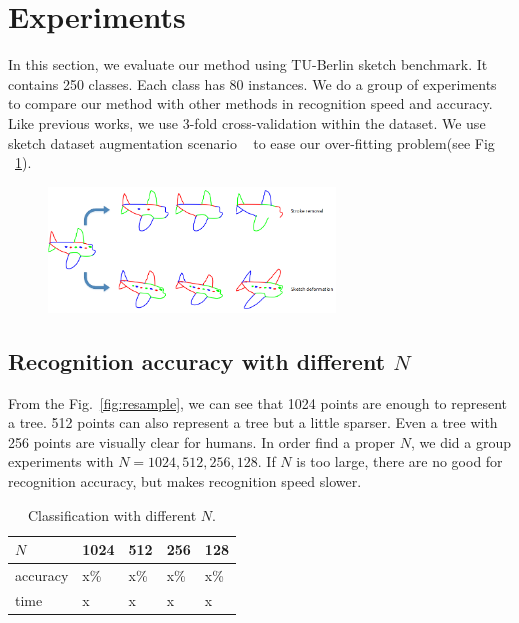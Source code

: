 \section{Experiments}
\label{sec:experiments}
In this section, we evaluate our method using  TU-Berlin sketch benchmark. It contains 250 classes. Each class has 80 instances. We do a group of experiments to compare our method with other methods in recognition speed and accuracy. Like previous works, we use 3-fold cross-validation within the dataset.  We use sketch dataset augmentation scenario  ~\cite{Yu2015SketchaNetTB} to ease our over-fitting problem(see Fig ~\ref{fig:aug_data}).

\begin{figure}[htbp]
    \center
    \includegraphics[width=3in]{images/aug_data.png}
    \label{fig:aug_data}
\end{figure}

\subsection{Recognition accuracy with different $N$}
\label{ssec:resample_number}

From the Fig.~\ref{fig:resample}, we can see that 1024 points are enough to represent a tree. 512 points can also represent a tree but a little sparser. Even a tree with 256 points are visually clear for humans. In order find a proper $N$, we did a group experiments with $N = 1024, 512, 256, 128$. If $N$ is too large, there are no good for recognition accuracy, but makes recognition speed slower.

\begin{table}[htbp]
\begin{tabular}{|p{1.4cm}|p{1.3cm}|p{1.3cm}|p{1.3cm}|p{1.3cm}|}
    \hline
     $N$ & 1024& 512 & 256 & 128\\
    \hline
     accuracy & x\% & x\% & x\%& x\%\\
    \hline
     time & x & x & x& x\\
    \hline
\end{tabular}
\caption{Classification with different $N$.}
\end{table}

